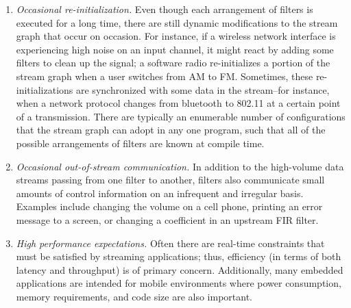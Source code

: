 \begin{enumerate}
\item {\it Occasional re-initialization.}  Even though each
arrangement of filters is executed for a long time, there are still
dynamic modifications to the stream graph that occur on occasion.
For instance, if a wireless network interface is experiencing high
noise on an input channel, it might react by adding some filters to
clean up the signal; a software radio re-initializes a portion of the
stream graph when a user switches from AM to FM.  Sometimes, these
re-initializations are synchronized with some data in the stream--for
instance, when a network protocol changes from bluetooth to 802.11 at
a certain point of a transmission.  There are typically an enumerable
number of configurations that the stream graph can adopt in any one
program, such that all of the possible arrangements of filters are
known at compile time.

\item {\it Occasional out-of-stream communication.}  In addition to
the high-volume data streams passing from one filter to another,
filters also communicate small amounts of control information on an
infrequent and irregular basis.  Examples include changing the volume
on a cell phone, printing an error message to a screen, or changing a
coefficient in an upstream FIR filter.

\item {\it High performance expectations.}  Often there are real-time
constraints that must be satisfied by streaming applications; thus,
efficiency (in terms of both latency and throughput) is of primary
concern.  Additionally, many embedded applications are intended for
mobile environments where power consumption, memory requirements, and
code size are also important.

\end{enumerate}



 





